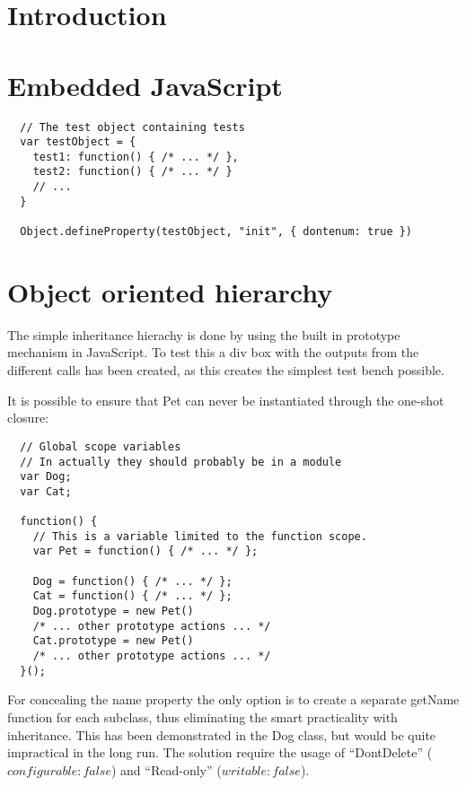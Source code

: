 \documentclass[a4paper,10pt]{article}
\author{
Søren Krogh -  20105661 \\
Emil Madsen - 20105376  \\
K. Rohde Fischer - 20052356\\}
\title{}
\begin{document}
\maketitle

\section*{Introduction}


\section*{Embedded JavaScript}

\begin{verbatim}
  // The test object containing tests
  var testObject = {
    test1: function() { /* ... */ },
    test2: function() { /* ... */ }
    // ...
  }

  Object.defineProperty(testObject, "init", { dontenum: true })
\end{verbatim}


\section*{Object oriented hierarchy}
The simple inheritance hierachy is done by using the built in
prototype mechanism in JavaScript.  To test this a div box with the
outputs from the different calls has been created, as this creates the
simplest test bench possible.

It is possible to ensure that Pet can never be instantiated through
the one-shot closure:

\begin{verbatim}
  // Global scope variables
  // In actually they should probably be in a module
  var Dog;
  var Cat;

  function() {
    // This is a variable limited to the function scope.
    var Pet = function() { /* ... */ };

    Dog = function() { /* ... */ };
    Cat = function() { /* ... */ };
    Dog.prototype = new Pet()
    /* ... other prototype actions ... */
    Cat.prototype = new Pet()
    /* ... other prototype actions ... */
  }();
\end{verbatim}

For concealing the name property the only option is to create a
separate getName function for each subclass, thus eliminating the
smart practicality with inheritance.  This has been demonstrated in
the Dog class, but would be quite impractical in the long run.  The
solution require the usage of ``DontDelete'' ($configurable: false$)
and ``Read-only'' ($writable: false$).
\end{document}
